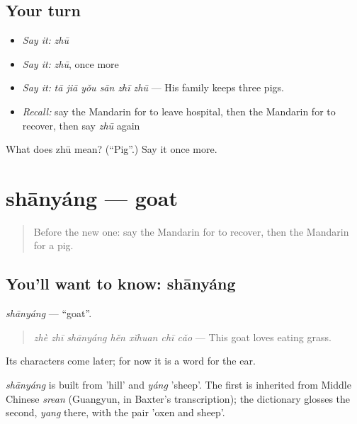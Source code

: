 \subsection*{Your turn}
\begin{itemize}
\raggedright
  \item \emph{Say it:} \emph{zhū}
  \item \emph{Say it:} \emph{zhū}, once more
  \item \emph{Say it:} \emph{tā jiā yǒu sān zhī zhū} — His family keeps three pigs.
  \item \emph{Recall:} say the Mandarin for to leave hospital, then the Mandarin for to recover, then say \emph{zhū} again
\end{itemize}

\begin{tcolorbox}[breakable,colback=teal!4,colframe=teal!35!black,title={Before you move on}]
What does zhū mean? (\textquotedblleft{}Pig\textquotedblright{}.) Say it once more.
\end{tcolorbox}
\section[shānyáng]{shānyáng — goat}

\label{lesson:ZH-C242-shanyang}



\begin{quote}
Before the new one: say the Mandarin for to recover, then the Mandarin for a pig.
\end{quote}

\subsection*{You'll want to know: shānyáng}
\emph{shānyáng} — \textquotedblleft{}goat\textquotedblright{}.

\begin{quote}
\emph{zhè zhī shānyáng hěn xǐhuan chī cǎo} — This goat loves eating grass.
\end{quote}

Its characters come later; for now it is a word for the ear.

\begin{cousinweb}
\emph{shānyáng} is built from  'hill' and \emph{yáng} 'sheep'. The first is inherited from Middle Chinese \emph{srean} (Guangyun, in Baxter's transcription); the dictionary glosses the second, \emph{yang} there, with the pair 'oxen and sheep'.
\end{cousinweb}

